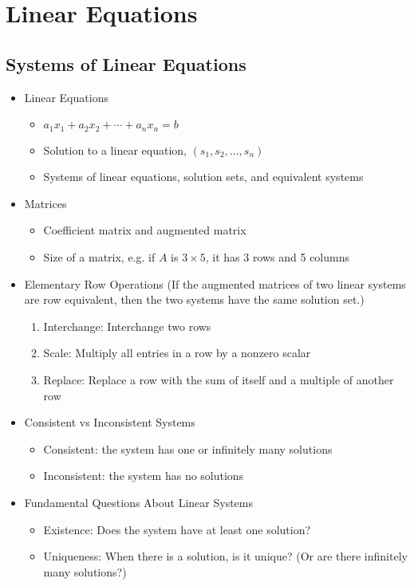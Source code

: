 \documentclass[10pt]{book}
\begin{document}

\chapter{Linear Equations}
\section{Systems of Linear Equations}
\begin{itemize}
	\item Linear Equations
		\begin{itemize}
			\item $a_1x_1 + a_2x_2 + \cdots + a_nx_n = b$
			\item Solution to a linear equation, $(s_1,s_2,\ldots,s_n)$
			\item Systems of linear equations, solution sets, and equivalent systems
		\end{itemize}
	\item Matrices
		\begin{itemize}
			\item Coefficient matrix and augmented matrix
			\item Size of a matrix, e.g. if $A$ is $3\times 5$, it has 3 rows and 5 columns
		\end{itemize}
	\item Elementary Row Operations (If the augmented matrices of two linear systems are row equivalent, then the two systems have the same solution set.)
		\begin{enumerate}
			\item Interchange: Interchange two rows
			\item Scale: Multiply all entries in a row by a nonzero scalar
			\item Replace: Replace a row with the sum of itself and a multiple of another row
		\end{enumerate}
	\item Consistent vs Inconsistent Systems
		\begin{itemize}
			\item Consistent: the system has one or infinitely many solutions
			\item Inconsistent: the system has no solutions
		\end{itemize}
	\item Fundamental Questions About Linear Systems
		\begin{itemize}
			\item Existence: Does the system have at least one solution?
			\item Uniqueness: When there is a solution, is it unique? (Or are there infinitely many solutions?)
		\end{itemize}
\end{itemize}
\end{document}
